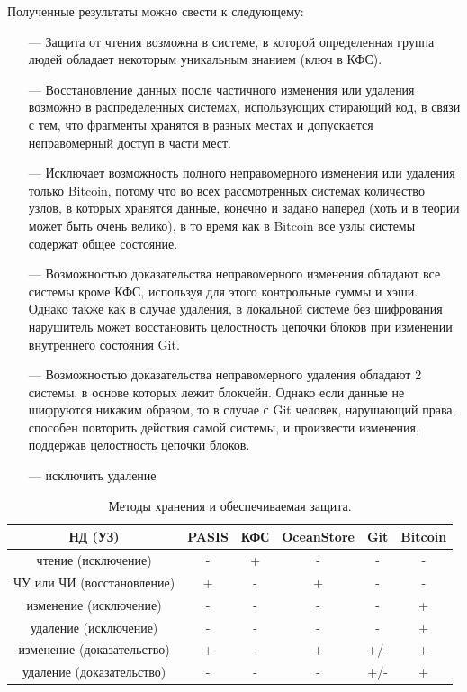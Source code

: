 Полученные результаты можно свести к следующему:
\begin{itemize}
    \item[---] Защита от чтения возможна в системе, в которой определенная группа людей обладает некоторым уникальным знанием (ключ в КФС).
    \item[---] Восстановление данных после частичного изменения или удаления возможно в распределенных системах, использующих стирающий код, в связи с тем, что фрагменты хранятся в разных местах и допускается неправомерный доступ в части мест.
    \item[---] Исключает возможность полного неправомерного изменения или удаления только Bitcoin, потому что во всех рассмотренных системах количество узлов, в которых хранятся данные, конечно и задано наперед (хоть и в теории может быть очень велико), в то время как в Bitcoin все узлы системы содержат общее состояние.
    \item[---] Возможностью доказательства неправомерного изменения обладают все системы кроме КФС, используя для этого контрольные суммы и хэши. Однако также как в случае удаления, в локальной системе без шифрования нарушитель может восстановить целостность цепочки блоков при изменении внутреннего состояния Git.
    \item[---] Возможностью доказательства неправомерного удаления обладают 2 системы, в основе которых лежит блокчейн. Однако если данные не шифруются никаким образом, то в случае с Git человек, нарушающий права, способен повторить действия самой системы, и произвести изменения, поддержав целостность цепочки блоков.
    \item[---] исключить удаление 
\end{itemize}

\begin{table}[h]
    \begin{center}
        \caption{\label{tab:res} Методы хранения и обеспечиваемая защита.}
        \begin{tabular}{|c|c|c|c|c|c|}
            \hline
            \bfseries НД (УЗ) & \bfseries PASIS & \bfseries КФС & \bfseries OceanStore & \bfseries Git & \bfseries Bitcoin  \\
            \hline
            чтение (исключение) & - & + & - & - & - \\ \hline
            ЧУ или ЧИ (восстановление) & + & - & + & - & - \\ \hline
            изменение (исключение) & - & - & - & - & + \\ \hline
            удаление (исключение) & - & - & - & - & + \\ \hline
            изменение (доказательство) & + & - & + & +/- & + \\ \hline
            удаление (доказательство) & - & - & - & +/- & + \\ \hline
        \end{tabular}
    \end{center}
\end{table}

